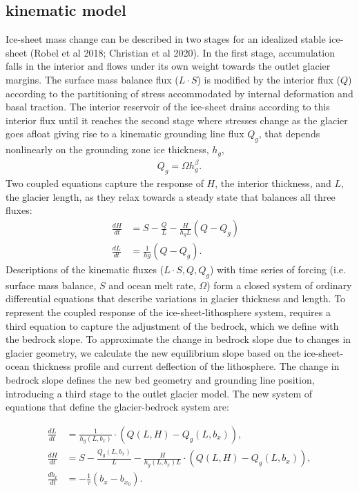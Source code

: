 \documentclass[tc, manuscript]{copernicus}
\begin{document}
\subsection{kinematic model}

Ice-sheet mass change can be described in two stages for an idealized stable ice-sheet (Robel et al 2018; Christian et al 2020).
In the first stage, accumulation falls in the interior and flows under its own weight towards the outlet glacier margins.
The surface mass balance flux ($L\cdot S$) is modified by the interior flux ($Q$) according to the partitioning of stress accommodated by internal deformation and basal traction.
The interior reservoir of the ice-sheet drains according to this interior flux until it reaches the second stage where stresses change as the glacier goes afloat giving rise to a kinematic grounding line flux $Q_g$, that depends nonlinearly on the grounding zone ice thickness, $h_g$,
\begin{align}
Q_g=\Omega h_g^\beta.
\end{align}
 Two coupled equations capture the response of $H$, the interior thickness, and $L$, the glacier length, as they relax towards a steady state that balances all three fluxes:
 \begin{align}
\frac{dH}{dt} &=S - \frac{Q}{L}-\frac{H}{h_g L}(Q-Q_g)&\\
\frac{dL}{dt} &=\frac{1}{hg}(Q-Q_g).&
\end{align}
Descriptions of the kinematic fluxes ($L\cdot S, Q, Q_g$) with time series of forcing (i.e. surface mass balance, $S$ and ocean melt rate, $\Omega$) form a closed system of ordinary differential equations that describe variations in glacier thickness and length. 
To represent the coupled response of the ice-sheet-lithosphere system, requires a third equation to capture the adjustment of the bedrock, which we define with the bedrock slope.
To approximate the change in bedrock slope due to changes in glacier geometry, we calculate the new equilibrium slope based on the ice-sheet-ocean thickness profile and current deflection of the lithosphere. 
The change in bedrock slope defines the new bed geometry and grounding line position, introducing a third stage to the outlet glacier model.
The new system of equations that define the glacier-bedrock system are: 

\begin{align}
    \frac{dL}{dt} & = \frac{1}{h_g(L,b_x)}\cdot(Q(L,H)-Q_g(L,b_x)), \\
    \frac{dH}{dt} & = S-\frac{Q_g(L,b_x)}{L}-\frac{H}{h_g(L,b_x) L} \cdot (Q(L,H)-Q_g(L,b_x)), \\
    \frac{db_x}{dt} & = -\frac{1}{\tau}(b_x - b_{x_0}).
\end{align}
\end{document}
